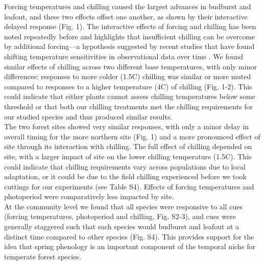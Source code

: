 \documentclass[11pt]{article}
\begin{document}
Forcing temperatures and chilling caused the largest advances in budburst and leafout, and these two effects offset one another, as shown by their interactive delayed response (Fig. 1). The interactive effects of forcing and chilling has been noted repeatedly before \cite[e.g.,][]{Heide:1993b,Caffarra:2011aa} and highlights that insufficient chilling can be overcome by additional forcing---a hypothesis suggested by recent studies that have found shifting temperature sensitivities in observational data over time \cite{yu2010,fu2015}. We found similar effects of chilling across two different base temperatures, with only minor differences: responses to more colder (1.5\degree C) chilling was similar or more muted compared to responses to a higher temperature (4\degree C) of chilling (Fig. 1-2). This could indicate that either plants cannot assess chilling temperatures below some threshold \cite{guy2014,Harrington:2010} or that both our chilling treatments met the chilling requirements for our studied species and thus produced similar results. \\

The two forest sites showed very similar responses, with only a minor delay in overall timing for the more northern site (Fig. 1) and a more pronounced effect of site through its interaction with chilling. The full effect of chilling depended on site, with a larger impact of site on the lower chilling temperature (1.5\degree C). This could indicate that chilling requirements vary across populations due to local adaptation, or it could be due to the field chilling experienced before we took cuttings for our experiments (see Table S4). Effects of forcing temperatures and photoperiod were comparatively less impacted by site. \\

At the community level we found that all species were responsive to all cues (forcing temperatures, photoperiod and chilling, Fig. S2-3), and cues were generally staggered such that each species would budburst and leafout at a distinct time compared to other species (Fig. S4). This provides support for the idea that spring phenology is an important component of the temporal niche \cite{gotelli1996,Loreau:2008xy} for temperate forest species.\\
\end{document}
